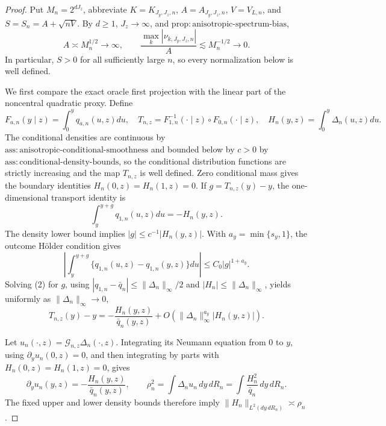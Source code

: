 \documentclass{article}
\begin{document}
\begin{proof}
Put \(M_n=2^{dJ_z}\), abbreviate \(K=K_{J_y,J_z,n}\), \(A=A_{J_y,J_z,n}\), \(V=V_{L,n}\), and \(S=S_n=A+\sqrt{nV}\). By \(d\ge1\), \(J_z\to\infty\), and \(\mathrm{prop{:}anisotropic\text{-}spectrum\text{-}bias}\),
\[
A\asymp M_n^{1/2}\longrightarrow\infty,
\qquad
\frac{\max_k|\nu_{k,J_y,J_z,n}|}{A}
\lesssim M_n^{-1/2}\longrightarrow0. \tag{1}
\]
In particular, \(S>0\) for all sufficiently large \(n\), so every normalization below is well defined.

We first compare the exact oracle first projection with the linear part of the noncentral quadratic proxy. Define
\[
F_{a,n}(y\mid z)=\int_0^yq_{a,n}(u,z)du,
\quad
T_{n,z}=F_{1,n}^{-1}(\cdot\mid z)\circ F_{0,n}(\cdot\mid z),
\quad
H_n(y,z)=\int_0^y\Delta_n(u,z)du.
\]
The conditional densities are continuous by \(\mathrm{ass{:}anisotropic\text{-}conditional\text{-}smoothness}\) and bounded below by \(c>0\) by \(\mathrm{ass{:}conditional\text{-}density\text{-}bounds}\), so the conditional distribution functions are strictly increasing and the map \(T_{n,z}\) is well defined. Zero conditional mass gives the boundary identities \(H_n(0,z)=H_n(1,z)=0\). If \(g=T_{n,z}(y)-y\), the one-dimensional transport identity is
\[
\int_y^{y+g}q_{1,n}(u,z)du=-H_n(y,z). \tag{2}
\]
The density lower bound implies \(|g|\le c^{-1}|H_n(y,z)|\). With \(a_y=\min\{s_y,1\}\), the outcome H\"older condition gives
\[
\left|\int_y^{y+g}\{q_{1,n}(u,z)-q_{1,n}(y,z)\}du\right|
\le C_0|g|^{1+a_y}.
\]
Solving (2) for \(g\), using \(|q_{1,n}-\bar q_n|\le\|\Delta_n\|_\infty/2\) and \(|H_n|\le\|\Delta_n\|_\infty\), yields uniformly as \(\|\Delta_n\|_\infty\to0\),
\[
T_{n,z}(y)-y
=-\frac{H_n(y,z)}{\bar q_n(y,z)}
+O\!\left(\|\Delta_n\|_\infty^{a_y}|H_n(y,z)|\right). \tag{3}
\]

Let \(u_n(\cdot,z)=\mathcal G_{n,z}\Delta_n(\cdot,z)\). Integrating its Neumann equation from \(0\) to \(y\), using \(\partial_yu_n(0,z)=0\), and then integrating by parts with \(H_n(0,z)=H_n(1,z)=0\), gives
\[
\partial_yu_n(y,z)=-\frac{H_n(y,z)}{\bar q_n(y,z)},
\qquad
\rho_n^2=\int\Delta_nu_n\,dy\,dR_n
=\int\frac{H_n^2}{\bar q_n}\,dy\,dR_n. \tag{4}
\]
The fixed upper and lower density bounds therefore imply \(\|H_n\|_{L^2(dy\,dR_n)}\asymp\rho_n\).


\end{proof}
\end{document}

